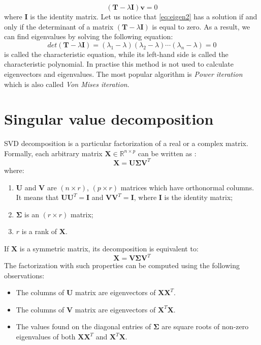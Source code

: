 \begin{appendices}
\begin{equation}\label{eq:eigen2}
    (\boldsymbol{T}-\lambda{\boldsymbol{I}})\boldsymbol{v}=0
\end{equation}
where $\boldsymbol{I}$ is the identity matrix. Let us notice that \cref{eq:eigen2} has a solution if and only if the determinant of a matrix $(\boldsymbol{T}-\lambda{\boldsymbol{I}})$ is equal to zero. As a result, we can find eigenvalues by solving the following equation:
\begin{equation}\label{eq:eigen3}
    det(\boldsymbol{T}-\lambda{\boldsymbol{I}}) = (\lambda_1-\lambda)(\lambda_2-\lambda)\cdots(\lambda_n-\lambda) = 0
\end{equation}
 is called the characteristic equation, while its left-hand side is called the characteristic polynomial. In practise this method is not used to calculate eigenvectors and eigenvalues. The most popular algorithm is \textit{Power iteration} which is also called \textit{Von Mises iteration}.


\newpage
\section{Singular value decomposition}
\label{app:svd}

SVD decomposition is a particular factorization of a real or a complex matrix. Formally, each arbitrary matrix $\boldsymbol{X} \in \mathbb{R}^{n \times p}$ can be written as \cite{Jolliffe}:
\begin{equation}
    \boldsymbol{X}=\boldsymbol{U}\boldsymbol{\Sigma}{\boldsymbol{V}^T}
\end{equation}
where:
\begin{enumerate}
    \item $\boldsymbol{U}$ and $\boldsymbol{V}$ are $(n \times r)$, $(p \times r)$ matrices which have orthonormal columns. It means that $\boldsymbol{U}\boldsymbol{U}^T=\boldsymbol{I}$ and $\boldsymbol{V}\boldsymbol{V}^T=\boldsymbol{I}$, where $\boldsymbol{I}$ is the identity matrix;
    \item $\boldsymbol{\Sigma}$ is an $(r \times r)$ matrix;
    \item $r$ is a rank of $\boldsymbol{X}$.
\end{enumerate}
If $\boldsymbol{X}$ is a symmetric matrix, its decomposition is equivalent to:
\begin{equation}
    \boldsymbol{X}=\boldsymbol{V}\boldsymbol{\Sigma}{\boldsymbol{V}^T}
\end{equation}
The factorization with such properties can be computed using the following observations:
\begin{itemize}
    \item The columns of $\boldsymbol{U}$ matrix are eigenvectors of $\boldsymbol{X}\boldsymbol{X}^T$.
    \item The columns of $\boldsymbol{V}$ matrix are eigenvectors of $\boldsymbol{X}^T\boldsymbol{X}$.
    \item The values found on the diagonal entries of $\boldsymbol{\Sigma}$ are square roots of non-zero eigenvalues of both $\boldsymbol{X}\boldsymbol{X}^T$ and $\boldsymbol{X}^T\boldsymbol{X}$.
\end{itemize}


\end{appendices}
